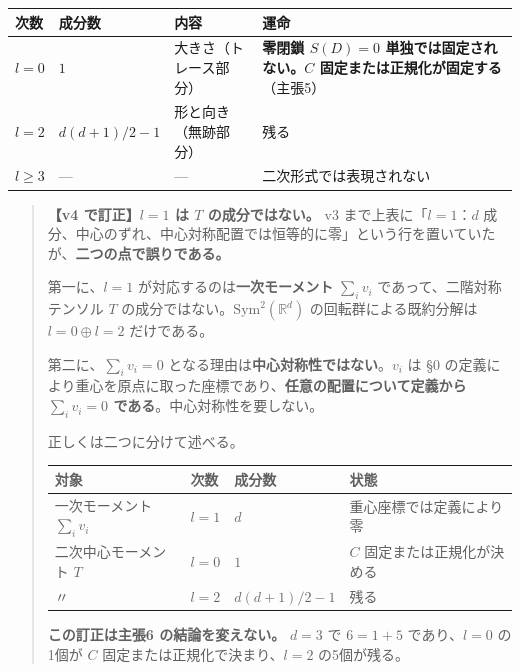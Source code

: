 \documentclass[
  10pt,
]{ltjsarticle}
\newcounter{none} %
\begin{document}
{\def\LTcaptype{none} %
\begin{longtable}[]{@{}
  >{\raggedright\arraybackslash}p{}
  >{\raggedright\arraybackslash}p{}
  >{\raggedright\arraybackslash}p{}
  >{\raggedright\arraybackslash}p{}@{}}
\toprule\noalign{}
\begin{minipage}[b]{\linewidth}\raggedright
次数
\end{minipage} & \begin{minipage}[b]{\linewidth}\raggedright
成分数
\end{minipage} & \begin{minipage}[b]{\linewidth}\raggedright
内容
\end{minipage} & \begin{minipage}[b]{\linewidth}\raggedright
運命
\end{minipage} \\
\midrule\noalign{}
\endhead
\bottomrule\noalign{}
\endlastfoot
\(l=0\) & \(1\) & 大きさ（トレース部分） & \textbf{零閉鎖 \(S(D)=0\)
単独では固定されない。\(C\) 固定または正規化が固定する}（主張5） \\
\(l=2\) & \(d(d+1)/2 - 1\) & 形と向き（無跡部分） & 残る \\
\(l\ge3\) & --- & --- & 二次形式では表現されない \\
\end{longtable}
}

\begin{quote}
\textbf{【v4 で訂正】\(l=1\) は \(T\) の成分ではない。} v3
まで上表に「\(l=1\)：\(d\)
成分、中心のずれ、中心対称配置では恒等的に零」という行を置いていたが、\textbf{二つの点で誤りである。}

第一に、\(l=1\) が対応するのは\textbf{一次モーメント} \(\sum_i v_i\)
であって、二階対称テンソル \(T\)
の成分ではない。\(\mathrm{Sym}^2(\mathbb{R}^d)\)
の回転群による既約分解は \(l=0 \oplus l=2\) だけである。

第二に、\(\sum_i v_i = 0\)
となる理由は\textbf{中心対称性ではない}。\(v_i\) は §0
の定義により重心を原点に取った座標であり、\textbf{任意の配置について定義から
\(\sum_i v_i = 0\) である}。中心対称性を要しない。

正しくは二つに分けて述べる。

{\def\LTcaptype{none} %
\begin{longtable}[]{@{}llll@{}}
\toprule\noalign{}
対象 & 次数 & 成分数 & 状態 \\
\midrule\noalign{}
\endhead
\bottomrule\noalign{}
\endlastfoot
一次モーメント \(\sum_i v_i\) & \(l=1\) & \(d\) &
重心座標では定義により零 \\
二次中心モーメント \(T\) & \(l=0\) & \(1\) & \(C\)
固定または正規化が決める \\
〃 & \(l=2\) & \(d(d+1)/2-1\) & 残る \\
\end{longtable}
}

\textbf{この訂正は主張6 の結論を変えない。} \(d=3\) で \(6 = 1+5\)
であり、\(l=0\) の1個が \(C\) 固定または正規化で決まり、\(l=2\)
の5個が残る。
\end{quote}
\end{document}
